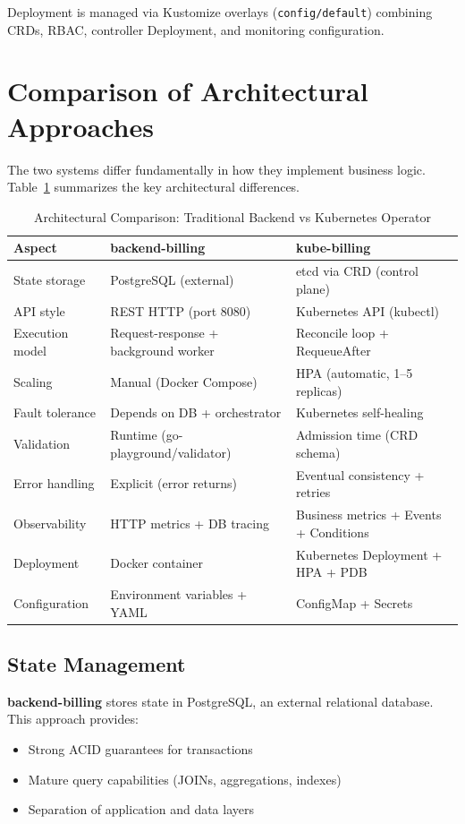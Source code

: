 Deployment is managed via Kustomize overlays (\texttt{config/default}) combining CRDs, RBAC, controller Deployment, and monitoring configuration.

\section{Comparison of Architectural Approaches}

The two systems differ fundamentally in how they implement business logic. Table~\ref{tab:arch-comparison} summarizes the key architectural differences.

\begin{table}[h]
\centering
\small
\caption{Architectural Comparison: Traditional Backend vs Kubernetes Operator}
\label{tab:arch-comparison}
\begin{tabularx}{\textwidth}{@{}lXX@{}}
\toprule
\textbf{Aspect} & \textbf{backend-billing} & \textbf{kube-billing} \\ \midrule
State storage & PostgreSQL (external) & etcd via CRD (control plane) \\
API style & REST HTTP (port 8080) & Kubernetes API (kubectl) \\
Execution model & Request-response + background worker & Reconcile loop + RequeueAfter \\
Scaling & Manual (Docker Compose) & HPA (automatic, 1--5 replicas) \\
Fault tolerance & Depends on DB + orchestrator & Kubernetes self-healing \\
Validation & Runtime (go-playground/validator) & Admission time (CRD schema) \\
Error handling & Explicit (error returns) & Eventual consistency + retries \\
Observability & HTTP metrics + DB tracing & Business metrics + Events + Conditions \\
Deployment & Docker container & Kubernetes Deployment + HPA + PDB \\
Configuration & Environment variables + YAML & ConfigMap + Secrets \\ \bottomrule
\end{tabularx}
\end{table}

\subsection{State Management}

\textbf{backend-billing} stores state in PostgreSQL, an external relational database. This approach provides:
\begin{itemize}
    \item Strong ACID guarantees for transactions
    \item Mature query capabilities (JOINs, aggregations, indexes)
    \item Separation of application and data layers
\end{itemize}

